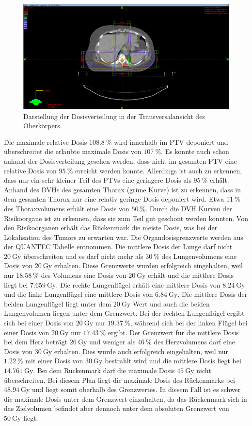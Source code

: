 \begin{figure}[h!]
	\centering
	\includegraphics[width=0.7\linewidth]{Bilder/BWS_Z}
	\caption{Darstellung der Dosisverteilung in der Transversalansicht des Oberkörpers.}
	\label{fig:bwsz}
\end{figure}

Die maximale relative Dosis $\SI{108,8}{\percent}$ wird innerhalb im PTV deponiert und überschreitet die erlaubte maximale Dosis von $\SI{107}{\percent}$. Es konnte auch schon anhand der Dosisverteilung gesehen werden, dass nicht im gesamten PTV eine relative Dosis von $\SI{95}{\percent}$ erreicht werden konnte. Allerdings ist auch zu erkennen, dass nur ein sehr kleiner Teil des PTVs eine geringere Dosis als $\SI{95}{\percent}$ erhält. Anhand des DVHs des gesamten Thorax (grüne Kurve) ist zu erkennen, dass in dem gesamten Thorax nur eine relativ geringe Dosis deponiert wird. Etwa $\SI{11}{\percent}$ des Thoraxvolumens erhält eine Dosis von  $\SI{50}{\percent}$. Durch die DVH Kurven der Risikoorgane ist zu erkennen, dass sie zum Teil gut geschont werden konnten. Von den Risikoorganen erhält das Rückenmark die meiste Dosis, was bei der Lokalisation des Tumors zu erwarten war.
Die Organdosisgrenzwerte werden aus der QUANTEC Tabelle entnommen. Die mittlere Dosis der Lunge darf nicht $\SI{20}{\gray}$ überschreiten und es darf nicht mehr als $\SI{30}{\percent}$ des Lungenvolumens eine Dosis von $\SI{20}{\gray}$ erhalten. Diese Grenzwerte wurden erfolgreich eingehalten, weil nur $\SI{18,58}{\percent}$ des Volumens eine Dosis von $\SI{20}{\gray}$ erhält und die mittlere Dosis liegt bei $\SI{7,659}{\gray}$. Die rechte Lungenflügel erhält eine mittlere Dosis von $\SI{8,24}{\gray}$ und die linke Lungenflügel eine mittlere Dosis von $\SI{6,84}{\gray}$. Die mittlere Dosis der beiden Lungenflügel liegt unter dem $\SI{20}{\gray}$ Wert und auch die beiden Lungenvolumen liegen unter dem Grenzwert. Bei der rechten Lungenflügel ergibt sich bei einer Dosis von $\SI{20}{\gray}$ nur $\SI{19,37}{\percent}$, während sich bei der linken Flügel bei einer Dosis von $\SI{20}{\gray}$ nur $\SI{17,43}{\percent}$ ergibt. Der Grenzwert für die mittlere Dosis bei dem Herz beträgt $\SI{26}{\gray}$ und weniger als $\SI{46}{\percent}$ des Herzvolumens darf eine Dosis von $\SI{30}{\gray}$ erhalten. Dies wurde auch erfolgreich eingehalten, weil nur $\SI{1,22}{\percent}$ mit einer Dosis von $\SI{30}{\gray}$ bestrahlt wird und die mittlere Dosis liegt bei $\SI{14,761}{\gray}$. Bei dem Rückenmark darf die maximale Dosis $\SI{45}{\gray}$ nicht überschreiten. Bei diesem Plan liegt die maximale Dosis des Rückenmarks bei $\SI{48.94}{\gray}$ und liegt somit oberhalb des Grenzwertes. In diesem Fall ist es schwer die maximale Dosis unter dem Grenzwert einzuhalten, da das Rückenmark sich in das Zielvolumen befindet aber dennoch unter dem absoluten Grenzwert von $\SI{50}{\gray}$ liegt.
